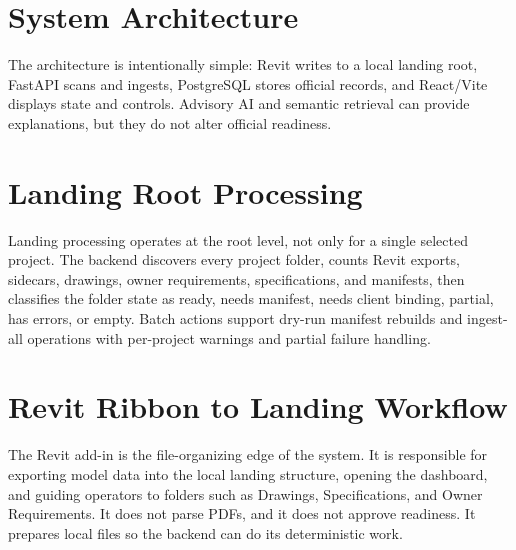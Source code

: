 \documentclass[11pt]{article}
\begin{document}
\section{System Architecture}
The architecture is intentionally simple: Revit writes to a local landing root, FastAPI scans and ingests, PostgreSQL stores official records, and React/Vite displays state and controls. Advisory AI and semantic retrieval can provide explanations, but they do not alter official readiness.

\begin{center}
\end{center}

\section{Landing Root Processing}
Landing processing operates at the root level, not only for a single selected project. The backend discovers every project folder, counts Revit exports, sidecars, drawings, owner requirements, specifications, and manifests, then classifies the folder state as ready, needs manifest, needs client binding, partial, has errors, or empty. Batch actions support dry-run manifest rebuilds and ingest-all operations with per-project warnings and partial failure handling.

\section{Revit Ribbon to Landing Workflow}
The Revit add-in is the file-organizing edge of the system. It is responsible for exporting model data into the local landing structure, opening the dashboard, and guiding operators to folders such as Drawings, Specifications, and Owner Requirements. It does not parse PDFs, and it does not approve readiness. It prepares local files so the backend can do its deterministic work.
\end{document}

